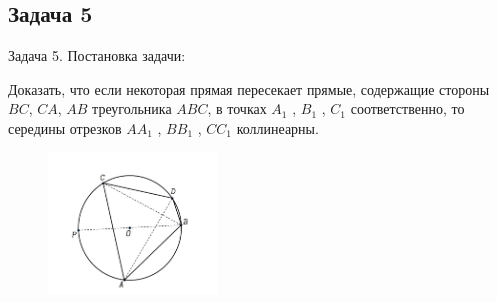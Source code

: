 \documentclass{beamer}
\begin{document}
\begin{frame}
   \subsection{Задача 5}
   \begin{block}{Задача 5. Постановка задачи:}


      Доказать, что если некоторая прямая пересекает прямые, содержащие стороны \(BC\), \(CA\), \(AB\) треугольника \(ABC\), в точках \(A_1\) , \(B_1\) , \(C_1\) соответственно, то середины отрезков \(AA_1\) , \(BB_1\) , \(CC_1\) коллинеарны.

      \begin{figure}[h]
         \centering
         \includegraphics[width=0.4\textwidth]{images/task5.pdf}
         \label{task5}
      \end{figure}
   \end{block}
\end{frame}
\end{document}
